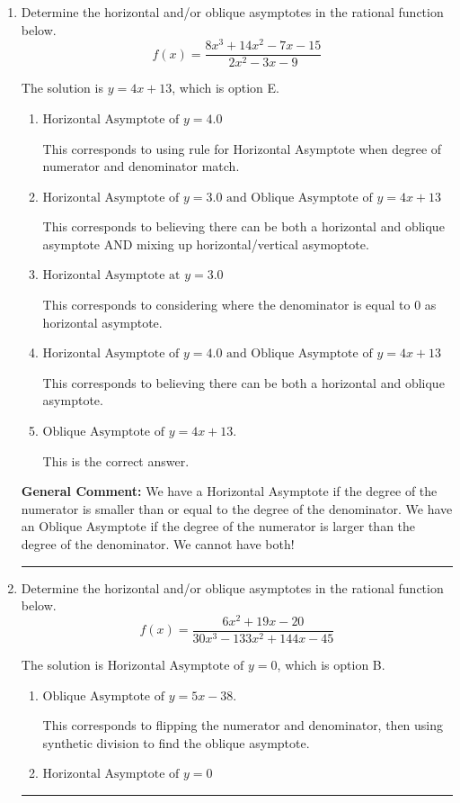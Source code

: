 \documentclass{extbook}[14pt]
\newcommand{\litem}[1]{\item #1

\rule{\textwidth}{0.4pt}}
\begin{document}
\begin{enumerate}\litem{
Determine the horizontal and/or oblique asymptotes in the rational function below.
\[ f(x) = \frac{8x^{3} +14 x^{2} -7 x -15}{2x^{2} -3 x -9} \]

The solution is \( y = 4x + 13 \), which is option E.\begin{enumerate}[label=\Alph*.]
\item \( \text{Horizontal Asymptote of } y = 4.0  \)

This corresponds to using rule for Horizontal Asymptote when degree of numerator and denominator match.
\item \( \text{Horizontal Asymptote of } y = 3.0 \text{ and Oblique Asymptote of } y = 4x + 13 \)

This corresponds to believing there can be both a horizontal and oblique asymptote AND mixing up horizontal/vertical asymoptote.
\item \( \text{Horizontal Asymptote at } y = 3.0 \)

This corresponds to considering where the denominator is equal to 0 as horizontal asymptote.
\item \( \text{Horizontal Asymptote of } y = 4.0 \text{ and Oblique Asymptote of } y = 4x + 13 \)

This corresponds to believing there can be both a horizontal and oblique asymptote.
\item \( \text{Oblique Asymptote of } y = 4x + 13. \)

This is the correct answer.
\end{enumerate}

\textbf{General Comment:} We have a Horizontal Asymptote if the degree of the numerator is smaller than or equal to the degree of the denominator. We have an Oblique Asymptote if the degree of the numerator is larger than the degree of the denominator. We cannot have both!
}
\litem{
Determine the horizontal and/or oblique asymptotes in the rational function below.
\[ f(x) = \frac{6x^{2} +19 x -20}{30x^{3} -133 x^{2} +144 x -45} \]

The solution is \( \text{Horizontal Asymptote of } y = 0 \), which is option B.\begin{enumerate}[label=\Alph*.]
\item \( \text{Oblique Asymptote of } y = 5x -38. \)

This corresponds to flipping the numerator and denominator, then using synthetic division to find the oblique asymptote.
\item \( \text{Horizontal Asymptote of } y = 0 \)


\end{enumerate}}
\end{enumerate}
\end{document}
